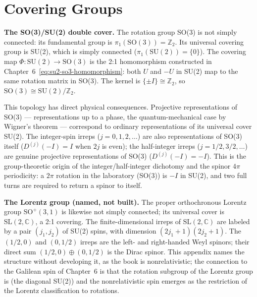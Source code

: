 \section{Covering Groups}
\label{sec:appendix-covering}

\medskip\noindent\textbf{The SO(3)/SU(2) double cover.} The rotation group SO(3) is not simply connected: its fundamental group is $\pi_1(\mathrm{SO}(3)) = \mathbb{Z}_2$. Its universal covering group is SU(2), which is simply connected ($\pi_1(\mathrm{SU}(2)) = \{0\}$). The covering map $\Phi : \mathrm{SU}(2) \to \mathrm{SO}(3)$ is the 2:1 homomorphism constructed in Chapter~6~\eqref{eq:su2-so3-homomorphism}: both $U$ and $-U$ in SU(2) map to the same rotation matrix in SO(3). The kernel is $\{\pm I\} \cong \mathbb{Z}_2$, so $\mathrm{SO}(3) \cong \mathrm{SU}(2)/\mathbb{Z}_2$.

This topology has direct physical consequences. Projective representations of SO(3) --- representations up to a phase, the quantum-mechanical case by Wigner's theorem --- correspond to ordinary representations of its universal cover SU(2). The integer-spin irreps ($j = 0,1,2,\ldots$) are also representations of SO(3) itself ($D^{(j)}(-I) = I$ when $2j$ is even); the half-integer irreps ($j = 1/2, 3/2, \ldots$) are genuine projective representations of SO(3) ($D^{(j)}(-I) = -I$). This is the group-theoretic origin of the integer/half-integer dichotomy and the spinor $4\pi$ periodicity: a $2\pi$ rotation in the laboratory (SO(3)) is $-I$ in SU(2), and two full turns are required to return a spinor to itself.

\medskip\noindent\textbf{The Lorentz group (named, not built).} The proper orthochronous Lorentz group $\mathrm{SO}^+(3,1)$ is likewise not simply connected; its universal cover is $\mathrm{SL}(2,\mathbb{C})$, a 2:1 covering. The finite-dimensional irreps of $\mathrm{SL}(2,\mathbb{C})$ are labeled by a pair $(j_1, j_2)$ of SU(2) spins, with dimension $(2j_1+1)(2j_2+1)$. The $(1/2, 0)$ and $(0, 1/2)$ irreps are the left- and right-handed Weyl spinors; their direct sum $(1/2, 0) \oplus (0, 1/2)$ is the Dirac spinor. This appendix names the structure without developing it, as the book is nonrelativistic; the connection to the Galilean spin of Chapter~6 is that the rotation subgroup of the Lorentz group is (the diagonal SU(2)) and the nonrelativistic spin emerges as the restriction of the Lorentz classification to rotations.
